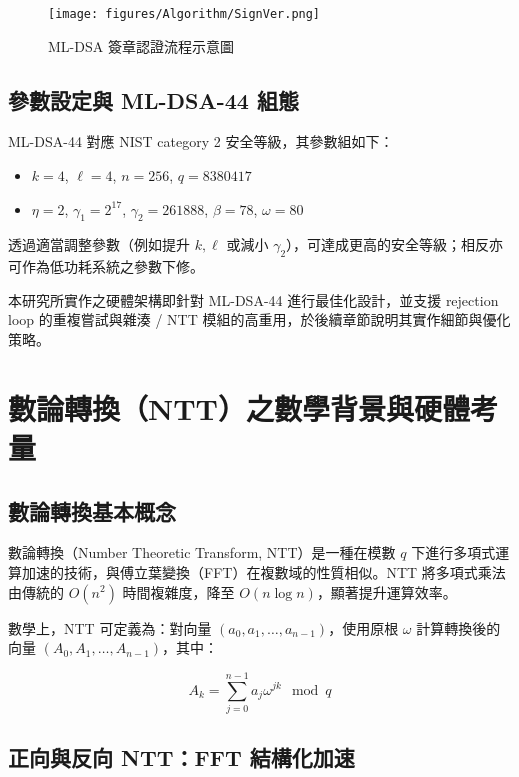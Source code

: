 \documentclass[12pt, a4paper, fleqn]{./styles/ntust_report}
\begin{document}
\begin{figure}[H]
    \centering
    \texttt{[image: figures/Algorithm/SignVer.png]}
    \caption{ML-DSA 簽章認證流程示意圖}
\end{figure}

\subsection{參數設定與 ML-DSA-44 組態}

ML-DSA-44 對應 NIST category 2 安全等級，其參數組如下：
\begin{itemize}
  \item $k=4$, $\ell=4$, $n=256$, $q=8380417$
  \item $\eta=2$, $\gamma_1=2^{17}$, $\gamma_2=261888$, $\beta=78$, $\omega=80$
\end{itemize}


透過適當調整參數（例如提升 $k, \ell$ 或減小 $\gamma_2$），可達成更高的安全等級；相反亦可作為低功耗系統之參數下修。

本研究所實作之硬體架構即針對 ML-DSA-44 進行最佳化設計，並支援 rejection loop 的重複嘗試與雜湊 / NTT 模組的高重用，於後續章節說明其實作細節與優化策略。



\section{數論轉換（NTT）之數學背景與硬體考量}
\subsection{數論轉換基本概念}
數論轉換（Number Theoretic Transform, NTT）是一種在模數 $q$ 下進行多項式運算加速的技術，與傅立葉變換（FFT）在複數域的性質相似。NTT 將多項式乘法由傳統的 $O(n^2)$ 時間複雜度，降至 $O(n \log n)$，顯著提升運算效率。

數學上，NTT 可定義為：對向量 $(a_0, a_1, \ldots, a_{n-1})$，使用原根 $\omega$ 計算轉換後的向量 $(A_0, A_1, \ldots, A_{n-1})$，其中：


\[
A_k = \sum_{j=0}^{n-1} a_j \omega^{jk} \mod q
\]



\subsection{正向與反向 NTT：FFT 結構化加速}
\end{document}
